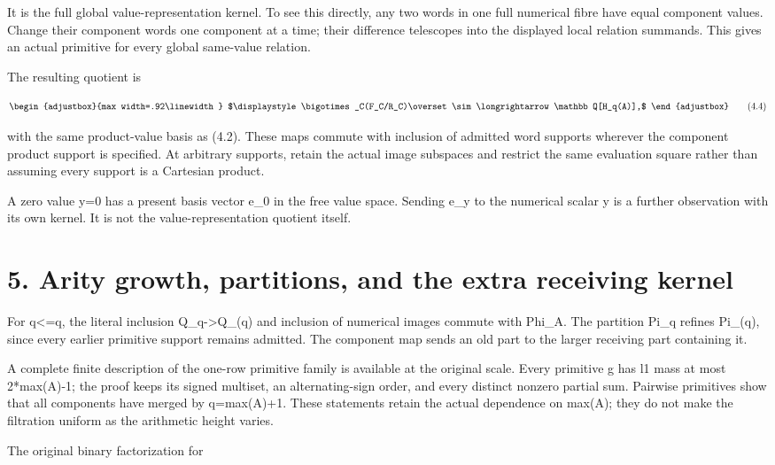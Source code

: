 It is the full global value-representation kernel. To see this directly, any two words in one full numerical fibre have equal component values. Change their component words one component at a time; their difference telescopes into the displayed local relation summands. This gives an actual primitive for every global same-value relation.

The resulting quotient is

\[
\begin{adjustbox}{max width=.92\linewidth}
$\displaystyle \bigotimes_C(F_C/R_C)\overset\sim\longrightarrow
\mathbb Q[H_q(A)],$
\end{adjustbox}
\tag{4.4}
\]

with the same product-value basis as (4.2). These maps commute with inclusion of admitted word supports wherever the component product support is specified. At arbitrary supports, retain the actual image subspaces and restrict the same evaluation square rather than assuming every support is a Cartesian product.

A zero value y=0 has a present basis vector e\_0 in the free value space. Sending e\_y to the numerical scalar y is a further observation with its own kernel. It is not the value-representation quotient itself.

\section{5. Arity growth, partitions, and the extra receiving kernel}\label{n19-arity-growth-partitions-and-the-extra-receiving-kernel}

For q\textless=q\textquotesingle, the literal inclusion Q\_q-\textgreater Q\_(q\textquotesingle) and inclusion of numerical images commute with Phi\_A. The partition Pi\_q refines Pi\_(q\textquotesingle), since every earlier primitive support remains admitted. The component map sends an old part to the larger receiving part containing it.

A complete finite description of the one-row primitive family is available at the original scale. Every primitive g has l1 mass at most 2*max(A)-1; the proof keeps its signed multiset, an alternating-sign order, and every distinct nonzero partial sum. Pairwise primitives show that all components have merged by q=max(A)+1. These statements retain the actual dependence on max(A); they do not make the filtration uniform as the arithmetic height varies.

The original binary factorization for

